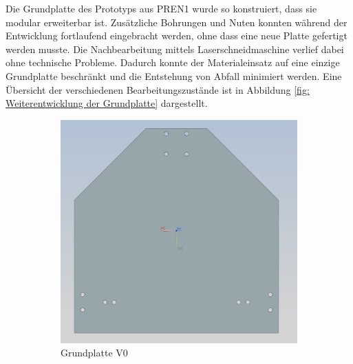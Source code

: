 Die Grundplatte des Prototyps aus PREN1 wurde so konstruiert, dass sie modular erweiterbar ist. Zusätzliche Bohrungen und Nuten konnten während der Entwicklung fortlaufend eingebracht werden, ohne dass eine neue Platte gefertigt werden musste. Die Nachbearbeitung mittels Laserschneidmaschine verlief dabei ohne technische Probleme. Dadurch konnte der Materialeinsatz auf eine einzige Grundplatte beschränkt und die Entstehung von Abfall minimiert werden. Eine Übersicht der verschiedenen Bearbeitungszustände ist in Abbildung \ref{fig: Weiterentwicklung der Grundplatte} dargestellt.

\begin{figure}[H] %
    \centering
    \begin{subfigure}[b]{0.45\textwidth}
        \centering
        \includegraphics[width=\linewidth]{assets/MT/Grundplatte_V0.png}
        \caption{Grundplatte V0}
    \end{subfigure}
    \hfill
    \begin{subfigure}[b]{0.45\textwidth}
        \centering

\end{subfigure}
\end{figure}
